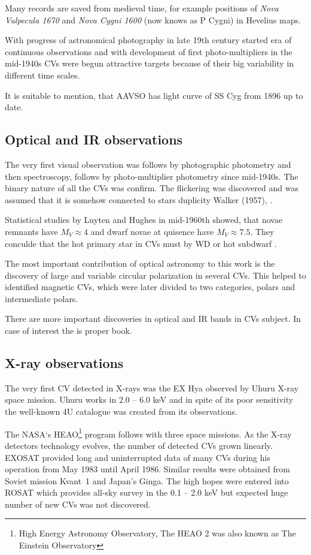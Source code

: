 \documentclass[oneside,a4paper,11pt]{report}
\begin{document}
Many records are saved from medieval time, for example positions of \textit{Nova Vulpecula 1670} and 
\textit{Nova Cygni 1600} (now knows as P Cygni) in Hevelius maps. 

With progress of astronomical photography in late 19th century started era of continuous observations
and with  development of first photo-multipliers in the mid-1940s CVs were begun attractive 
targets because of their big variability in different time scales. 

It is suitable to mention, that AAVSO has light curve of SS Cyg from 1896 up to date. 
\subsection{Optical and IR observations}
The very first visual observation was follows by photographic photometry and then spectroscopy, 
follows by photo-multiplier photometry since mid-1940s. The binary nature of all the CVs was confirm. 
The flickering was discovered and was assumed that it is somehow connected to stars duplicity Walker (1957),
\citet{warner:1}.

Statistical studies by Luyten and Hughes in mid-1960th showed, that novae remnants have $M_V \approx 4$ and 
dwarf novae at quisence have $M_V \approx 7.5$. They conculde that the hot primary star in CVs must by WD or 
 hot subdwarf \citet{warner:1}.   

The most important contribution of optical astronomy to this work is the discovery of large and 
variable circular polarization in several CVs. This helped to identified magnetic CVs, 
which were later divided to two categories, polars and intermediate polars.

There are more important discoveries in optical and IR bands in CVs subject. In case of interest the 
 \citet{warner:1} is proper book. 
   
   
\subsection{X-ray observations}
The very first CV detected in X-rays was the EX Hya observed by Uhuru X-ray space mission. 
Uhuru  works in 2.0 – 6.0 keV and in spite of its poor sensitivity the well-known 4U catalogue
 was created \citet{1978ApJS...38..357F} from its observations.

The NASA`s HEAO\footnote{High Energy Astronomy Observatory, The HEAO 2 was also known as 
The Einstein Observatory} program follows with three space missions. As the X-ray detectors 
technology evolves, the number of detected CVs grown linearly. \mbox{EXOSAT} provided long and 
uninterrupted data of many CVs during his operation from May 1983 until April 1986. 
Similar results were obtained from Soviet mission \mbox{Kvant 1} and Japan's Ginga.
The high hopes were entered into ROSAT which provides all-sky survey in the
 0.1 – 2.0 keV but expected huge number of new CVs was not discovered. 
\end{document}

